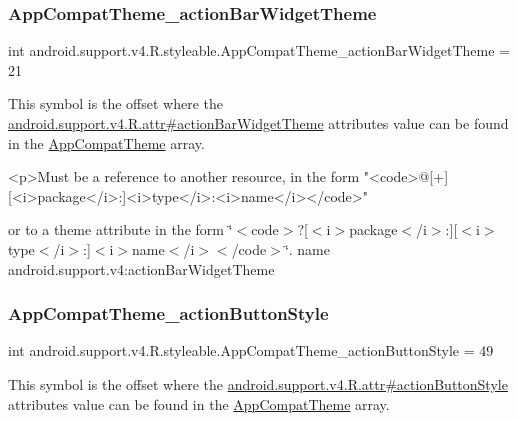 \subsubsection{\texorpdfstring{App\+Compat\+Theme\+\_\+action\+Bar\+Widget\+Theme}{AppCompatTheme\_actionBarWidgetTheme}}
{\footnotesize\ttfamily int android.\+support.\+v4.\+R.\+styleable.\+App\+Compat\+Theme\+\_\+action\+Bar\+Widget\+Theme = 21\hspace{0.3cm}{\ttfamily [static]}}

This symbol is the offset where the \hyperlink{classandroid_1_1support_1_1v4_1_1R_1_1attr_ae29f1c530c505df758e34b5892c7ccd1}{android.\+support.\+v4.\+R.\+attr\#action\+Bar\+Widget\+Theme} attribute\textquotesingle{}s value can be found in the \hyperlink{classandroid_1_1support_1_1v4_1_1R_1_1styleable_ac07ebbe62ed977f6dcaadc6397840ace}{App\+Compat\+Theme} array.

\begin{DoxyVerb}      <p>Must be a reference to another resource, in the form "<code>@[+][<i>package</i>:]<i>type</i>:<i>name</i></code>"
\end{DoxyVerb}
 or to a theme attribute in the form \char`\"{}$<$code$>$?\mbox{[}$<$i$>$package$<$/i$>$\+:\mbox{]}\mbox{[}$<$i$>$type$<$/i$>$\+:\mbox{]}$<$i$>$name$<$/i$>$$<$/code$>$\char`\"{}.  name android.\+support.\+v4\+:action\+Bar\+Widget\+Theme \mbox{\label{classandroid_1_1support_1_1v4_1_1R_1_1styleable_a80982be55634192a193cf55c01a21de4}} 
\subsubsection{\texorpdfstring{App\+Compat\+Theme\+\_\+action\+Button\+Style}{AppCompatTheme\_actionButtonStyle}}
{\footnotesize\ttfamily int android.\+support.\+v4.\+R.\+styleable.\+App\+Compat\+Theme\+\_\+action\+Button\+Style = 49\hspace{0.3cm}{\ttfamily [static]}}

This symbol is the offset where the \hyperlink{classandroid_1_1support_1_1v4_1_1R_1_1attr_a949bd6a877fac5b545925783cb5acff2}{android.\+support.\+v4.\+R.\+attr\#action\+Button\+Style} attribute\textquotesingle{}s value can be found in the \hyperlink{classandroid_1_1support_1_1v4_1_1R_1_1styleable_ac07ebbe62ed977f6dcaadc6397840ace}{App\+Compat\+Theme} array.

